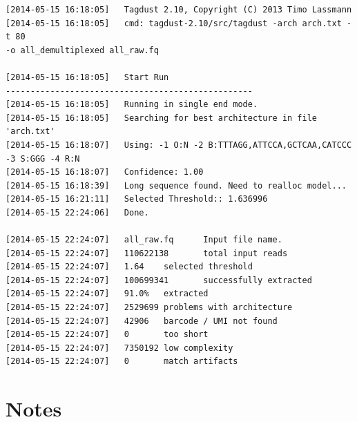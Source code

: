 \documentclass[11pt,a4paper,oneside]{book}
\begin{document}
{\small
\begin{verbatim}
[2014-05-15 16:18:05]   Tagdust 2.10, Copyright (C) 2013 Timo Lassmann
[2014-05-15 16:18:05]   cmd: tagdust-2.10/src/tagdust -arch arch.txt -t 80 
-o all_demultiplexed all_raw.fq 

[2014-05-15 16:18:05]   Start Run
--------------------------------------------------
[2014-05-15 16:18:05]   Running in single end mode.
[2014-05-15 16:18:05]   Searching for best architecture in file 'arch.txt'
[2014-05-15 16:18:07]   Using: -1 O:N -2 B:TTTAGG,ATTCCA,GCTCAA,CATCCC  -3 S:GGG -4 R:N 
[2014-05-15 16:18:07]   Confidence: 1.00
[2014-05-15 16:18:39]   Long sequence found. Need to realloc model...
[2014-05-15 16:21:11]   Selected Threshold:: 1.636996
[2014-05-15 22:24:06]   Done.

[2014-05-15 22:24:07]   all_raw.fq      Input file name.
[2014-05-15 22:24:07]   110622138       total input reads
[2014-05-15 22:24:07]   1.64    selected threshold
[2014-05-15 22:24:07]   100699341       successfully extracted
[2014-05-15 22:24:07]   91.0%   extracted
[2014-05-15 22:24:07]   2529699 problems with architecture
[2014-05-15 22:24:07]   42906   barcode / UMI not found
[2014-05-15 22:24:07]   0       too short
[2014-05-15 22:24:07]   7350192 low complexity
[2014-05-15 22:24:07]   0       match artifacts
\end{verbatim}
}

\section{Notes}

\end{document}
